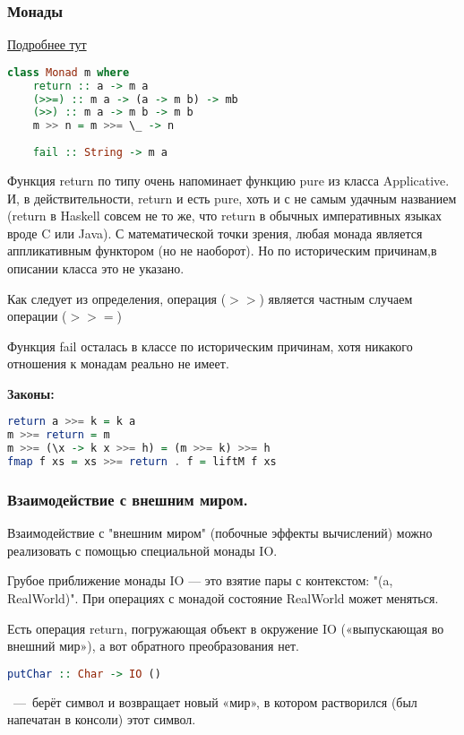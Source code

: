 \documentclass{article}
\begin{document}
\subsubsection{Монады}
\href{http://cmc-msu-ai.github.io/haskell-course/lecture/2013/09/08/applicative-and-monad.html}{Подробнее тут}
\begin{lstlisting}[language=Haskell]
class Monad m where
	return :: a -> m a
	(>>=) :: m a -> (a -> m b) -> mb
	(>>) :: m a -> m b -> m b
	m >> n = m >>= \_ -> n
	
	fail :: String -> m a
\end{lstlisting}

Функция return по типу очень напоминает функцию pure из класса Applicative. И, в действительности, return и есть pure, хоть и с не самым удачным названием (return в Haskell совсем не то же, что return в обычных императивных языках вроде C или Java). С математической точки зрения, любая монада является аппликативным функтором (но не наоборот). Но по историческим причинам,в описании класса это не указано.

Как следует из определения, операция ($>>$) является частным случаем операции ($>>=$)

Функция fail осталась в классе по историческим причинам, хотя никакого отношения к монадам реально не имеет.

\textbf{Законы:}
\begin{lstlisting}[language=Haskell]
return a >>= k = k a
m >>= return = m
m >>= (\x -> k x >>= h) = (m >>= k) >>= h
fmap f xs = xs >>= return . f = liftM f xs
\end{lstlisting}

\subsubsection{Взаимодействие с внешним миром.}
Взаимодействие с "внешним миром" (побочные эффекты вычислений) можно реализовать с помощью специальной монады IO.

Грубое приближение монады IO — это взятие пары с контекстом: "(a, RealWorld)". При операциях с монадой состояние RealWorld может меняться.

Есть операция return, погружающая объект в окружение IO («выпускающая во внешний мир»), а вот обратного преобразования нет.

\begin{lstlisting}[language=Haskell]
putChar :: Char -> IO () 
\end{lstlisting}~---~берёт символ и возвращает новый «мир», в котором растворился (был напечатан в консоли) этот символ.
\end{document}
